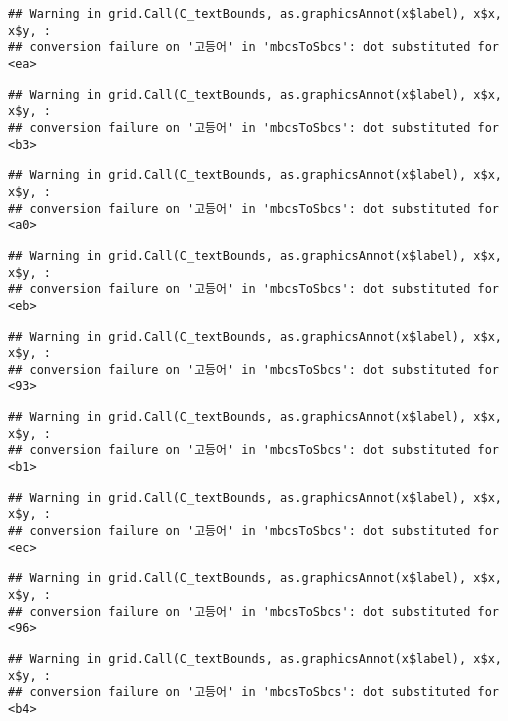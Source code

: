 \documentclass[
]{article}
\begin{document}
\begin{verbatim}
## Warning in grid.Call(C_textBounds, as.graphicsAnnot(x$label), x$x, x$y, :
## conversion failure on '고등어' in 'mbcsToSbcs': dot substituted for <ea>
\end{verbatim}

\begin{verbatim}
## Warning in grid.Call(C_textBounds, as.graphicsAnnot(x$label), x$x, x$y, :
## conversion failure on '고등어' in 'mbcsToSbcs': dot substituted for <b3>
\end{verbatim}

\begin{verbatim}
## Warning in grid.Call(C_textBounds, as.graphicsAnnot(x$label), x$x, x$y, :
## conversion failure on '고등어' in 'mbcsToSbcs': dot substituted for <a0>
\end{verbatim}

\begin{verbatim}
## Warning in grid.Call(C_textBounds, as.graphicsAnnot(x$label), x$x, x$y, :
## conversion failure on '고등어' in 'mbcsToSbcs': dot substituted for <eb>
\end{verbatim}

\begin{verbatim}
## Warning in grid.Call(C_textBounds, as.graphicsAnnot(x$label), x$x, x$y, :
## conversion failure on '고등어' in 'mbcsToSbcs': dot substituted for <93>
\end{verbatim}

\begin{verbatim}
## Warning in grid.Call(C_textBounds, as.graphicsAnnot(x$label), x$x, x$y, :
## conversion failure on '고등어' in 'mbcsToSbcs': dot substituted for <b1>
\end{verbatim}

\begin{verbatim}
## Warning in grid.Call(C_textBounds, as.graphicsAnnot(x$label), x$x, x$y, :
## conversion failure on '고등어' in 'mbcsToSbcs': dot substituted for <ec>
\end{verbatim}

\begin{verbatim}
## Warning in grid.Call(C_textBounds, as.graphicsAnnot(x$label), x$x, x$y, :
## conversion failure on '고등어' in 'mbcsToSbcs': dot substituted for <96>
\end{verbatim}

\begin{verbatim}
## Warning in grid.Call(C_textBounds, as.graphicsAnnot(x$label), x$x, x$y, :
## conversion failure on '고등어' in 'mbcsToSbcs': dot substituted for <b4>
\end{verbatim}
\end{document}
